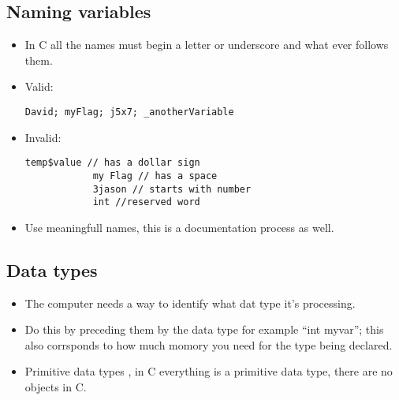 \subsection{Naming variables}
\begin{itemize}
    \item In C all the names must begin a letter or underscore and what ever follows them.
    \item Valid:
        \begin{Verbatim}[breaklines=true, breakanywhere=true]
            David; myFlag; j5x7; _anotherVariable
        \end{Verbatim}
    
    \item Invalid:
        \begin{Verbatim}[breaklines=true, breakanywhere=true]
            temp$value // has a dollar sign
            my Flag // has a space 
            3jason // starts with number
            int //reserved word
        \end{Verbatim}
    
    \item Use meaningfull names, this is a documentation process as well.
\end{itemize}
\subsection{Data types}
\begin{itemize}
    \item The computer needs a way to identify what dat type it's processing.
    \item Do this by preceding them by the data type for example ``int myvar''; this also corrsponds to how much momory you need for the type being declared.
    \item Primitive data types , in C everything is a primitive data type, there are no objects in C.
\end{itemize}
